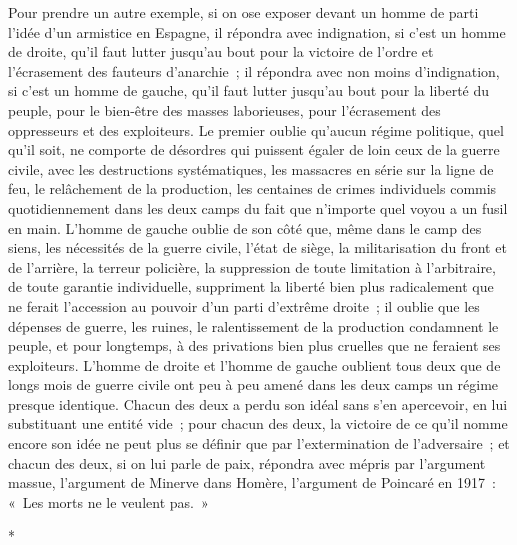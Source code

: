 \documentclass[french,twoside]{book} %
\begin{document}
Pour prendre un autre exemple, si on ose exposer devant un homme de parti l'idée d'un armistice en Espagne, il répondra avec indignation, si c'est un homme de droite, qu'il faut lutter jusqu'au bout pour la victoire de l'ordre et l'écrasement des fauteurs d'anarchie ; il répondra avec non moins d'indi­gnation, si c'est un homme de gauche, qu'il faut lutter jusqu'au bout pour la liberté du peuple, pour le bien-être des masses laborieuses, pour l'écrasement des oppresseurs et des exploiteurs. Le premier oublie qu'aucun régime politique, quel qu'il soit, ne comporte de désordres qui puissent égaler de loin ceux de la guerre civile, avec les destructions systématiques, les massacres en série sur la ligne de feu, le relâchement de la production, les centaines de crimes individuels commis quotidiennement dans les deux camps du fait que n'importe quel voyou a un fusil en main. L'homme de gauche oublie de son côté que, même dans le camp des siens, les nécessités de la guerre civile, l'état de siège, la militarisation du front et de l'arrière, la terreur policière, la suppression de toute limitation à l'arbitraire, de toute garantie individuelle, suppriment la liberté bien plus radicalement que ne ferait l'accession au pouvoir d'un parti d'extrême droite ; il oublie que les dépenses de guerre, les ruines, le ralentissement de la production condamnent le peuple, et pour longtemps, à des privations bien plus cruelles que ne feraient ses exploiteurs. L'homme de droite et l'homme de gauche oublient tous deux que de longs mois de guerre civile ont peu à peu amené dans les deux camps un régime presque identique. Chacun des deux a perdu son idéal sans s'en apercevoir, en lui substituant une entité vide ; pour chacun des deux, la victoire de ce qu'il nomme encore son idée ne peut plus se définir que par l'extermination de l'adversaire ; et chacun des deux, si on lui parle de paix, répondra avec mépris par l'argument massue, l'argument de Minerve dans Homère, l'argument de Poincaré en 1917 : « Les morts ne le veulent pas. »\par

\begin{center}
\noindent \centerline{*}\par
\end{center}
\end{document}
